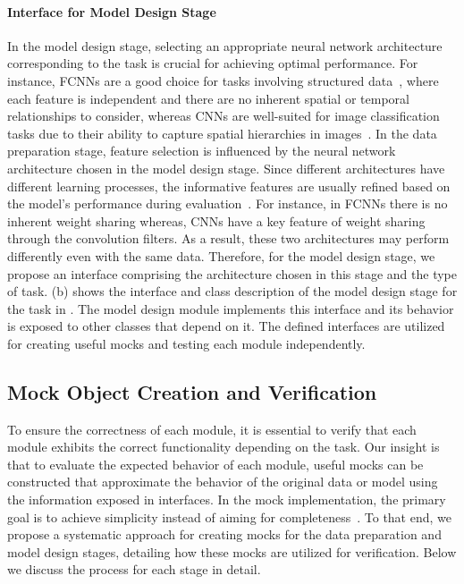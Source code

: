 \paragraph{Interface for Model Design Stage}
In the model design stage, selecting an appropriate neural network architecture corresponding to the task is crucial for achieving optimal performance. 
For instance, FCNNs are a good choice for tasks involving structured data~\cite{borisov2022deep}, where each feature is independent and there are no inherent spatial or temporal relationships to consider, whereas CNNs are well-suited for image classification tasks due to their ability to capture spatial hierarchies in images~\cite{lecun2015deep}.
In the data preparation stage, feature selection is influenced by the neural network architecture chosen in the model design stage. 
Since different architectures have different learning processes, the informative features 
are usually refined based on the model's performance during evaluation~\cite{biswas22art}.
For instance, in FCNNs there is no inherent weight sharing 
whereas, CNNs have a key feature of weight sharing through the convolution filters.
As a result, these two architectures may perform differently even with the same data. 
Therefore, for the model design stage, we propose an interface comprising the architecture chosen in this stage and the type of task.
(b) shows the interface and class description of the model design stage for the task in .
The model design module implements this interface and its behavior is exposed to other classes that depend on it.
The defined interfaces are utilized for creating useful mocks and testing each module independently.




\subsection{Mock Object Creation and Verification}
To ensure the correctness of each module, it is essential to verify 
that each module exhibits the correct functionality depending on the task.
Our insight is that to evaluate the expected behavior of each module, useful mocks can be constructed that approximate the behavior of the original data or model using the information exposed in interfaces.
In the mock implementation, the primary goal is to achieve simplicity instead of aiming for completeness~\cite{mackinnon2000endotesting}.
To that end, we propose a systematic approach for creating mocks for the data preparation and model design stages, detailing how these mocks are utilized for verification.
Below we discuss 
the process for each stage in detail.


